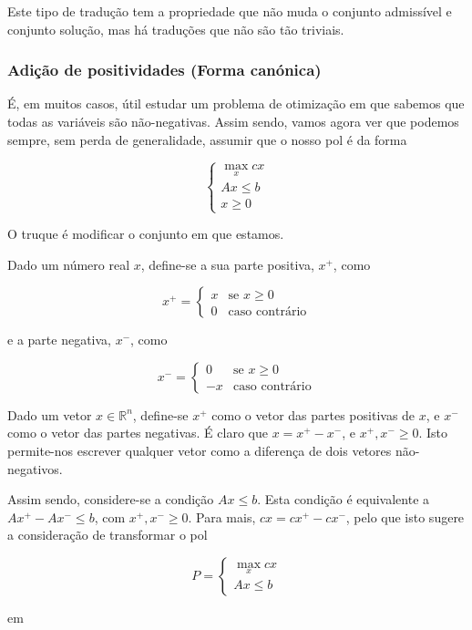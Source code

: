 \documentclass{article}
\newcommand{\R}{\mathbb{R}}
\theoremstyle{definition}
\begin{document}
	Este tipo de tradução tem a propriedade que não muda o conjunto admissível e conjunto solução, mas há traduções que não são tão triviais.
	
	\subsubsection{Adição de positividades (Forma canónica)}
	
	É, em muitos casos, útil estudar um problema de otimização em que sabemos que todas as variáveis são não-negativas. Assim sendo, vamos agora ver que podemos sempre, sem perda de generalidade, assumir que o nosso pol é da forma
	
	\[
	\begin{cases}
	\max\limits_x cx\\
	Ax \leq b\\
	x \geq 0
	\end{cases}
	\]
	
	O truque é modificar o conjunto em que estamos.
	
	Dado um número real $x$, define-se a sua parte positiva, $x^+$, como
	
	\[
	x^+ =
	\begin{cases}
	x & \text{se } x \geq 0 \\
	0 & \text{caso contrário}
	\end{cases}
	\]
	
	e a parte negativa, $x^-$, como
	
	\[
	x^- =
	\begin{cases}
	0 & \text{se } x \geq 0 \\
	-x & \text{caso contrário}
	\end{cases}
	\]
	
	Dado um vetor $x \in \R^n$, define-se $x^+$ como o vetor das partes positivas de $x$, e $x^-$ como o vetor das partes negativas. É claro que $x = x^+ - x^-$, e $x^+, x^- \geq 0$. Isto permite-nos escrever qualquer vetor como a diferença de dois vetores não-negativos.
	
	Assim sendo, considere-se a condição $Ax \leq b$. Esta condição é equivalente a $Ax^+ - Ax^- \leq b$, com $x^+, x^- \geq 0$. Para mais, $cx = cx^+ - cx^-$, pelo que isto sugere a consideração de transformar o pol
	
	\[
	P =
	\begin{cases}
	\max\limits_x cx\\
	Ax \leq b
	\end{cases}
	\]
	
	em
	
\end{document}

